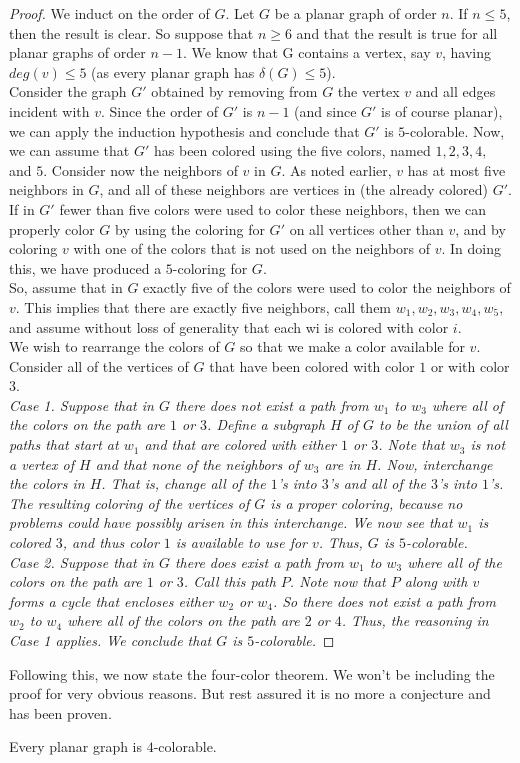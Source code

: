 \begin{proof}
    We induct on the order of $G$. Let $G$ be a planar graph of order $n$. If $n \le 5$, then the result is clear. So suppose that $n \ge 6$ and that the result is true for all planar graphs of order $n - 1$. We know that G contains a vertex, say $v$, having $deg(v) \le 5$ (as every planar graph has $\delta(G) \le 5$).\\
    Consider the graph $G'$ obtained by removing from $G$ the vertex $v$ and all edges incident with $v$. Since the order of $G'$ is $n - 1$ (and since $G'$ is of course planar), we can apply the induction hypothesis and conclude that $G'$ is $5$-colorable. Now, we can assume that $G'$ has been colored using the five colors, named $1,2,3,4,$ and $5$. Consider now the neighbors of $v$ in $G$. As noted earlier, $v$ has at most five neighbors in $G$, and all of these neighbors are vertices in (the already colored) $G'$.\\
    If in $G'$ fewer than five colors were used to color these neighbors, then we can properly color $G$ by using the coloring for $G'$ on all vertices other than $v$, and by coloring $v$ with one of the colors that is not used on the neighbors of $v$. In doing this, we have produced a $5$-coloring for $G$.\\
    So, assume that in $G$ exactly five of the colors were used to color the neighbors of $v$. This implies that there are exactly five neighbors, call them $w_1, w_2, w_3, w_4, w_5,$ and assume without loss of generality that each wi is colored with color $i$.\\
    We wish to rearrange the colors of $G$ so that we make a color available for $v$. Consider all of the vertices of $G$ that have been colored with color $1$ or with color $3$.\\
    \em{Case 1.} Suppose that in $G$ there does not exist a path from $w_1$ to $w_3$ where all of the colors on the path are $1$ or $3$. Define a subgraph $H$ of $G$ to be the union of all paths that start at $w_1$ and that are colored with either $1$ or $3$. Note that $w_3$ is not a vertex of $H$ and that none of the neighbors of $w_3$ are in $H$. Now, interchange the colors in $H$. That is, change all of the $1$'s into $3$'s and all of the $3$'s into $1$'s. The resulting coloring of the vertices of $G$ is a proper coloring, because no problems could have possibly arisen in this interchange. We now see that $w_1$ is colored $3$, and thus color $1$ is available to use for $v$. Thus, $G$ is $5$-colorable.\\
    \em{Case 2.} Suppose that in $G$ there does exist a path from $w_1$ to $w_3$ where all of the colors on the path are $1$ or $3$. Call this path $P$. Note now that $P$ along with $v$ forms a cycle that encloses either $w_2$ or $w_4$. So there does not exist a path from $w_2$ to $w_4$ where all of the colors on the path are $2$ or $4$. Thus, the reasoning in \em{Case 1} applies. We conclude that $G$ is $5$-colorable.
\end{proof}

Following this, we now state the four-color theorem. We won't be including the proof for very obvious reasons. But rest assured it is no more a conjecture and has been proven.
\begin{thm}
    Every planar graph is $4$-colorable.
\end{thm}